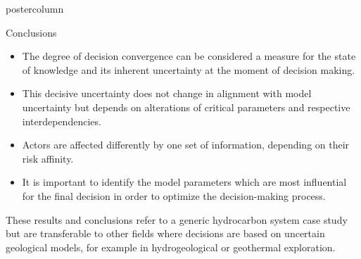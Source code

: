 \documentclass{beamer}
\begin{document}
\begin{frame}
\begin{columns}
\begin{column}{.618\textwidth}
\begin{beamercolorbox}[center]{postercolumn}
\begin{minipage}{.98\textwidth}
{				
\begin{myblock}{Conclusions}
\begin{itemize}
\item The degree of decision convergence can be considered a measure for the state of knowledge and its inherent uncertainty at the moment of decision making.
\item This decisive uncertainty does not change in alignment with model uncertainty but depends on alterations of critical parameters and respective interdependencies.
\item Actors are affected differently by one set of information, depending on their risk affinity.
\item It is important to identify the model parameters which are most influential for the final decision in order to
optimize the decision-making process.
\end{itemize}
These results and conclusions refer to a generic hydrocarbon system case study but are transferable to other fields where decisions
are based on uncertain geological models, for example in hydrogeological or geothermal exploration.

\end{myblock}}
\end{minipage}
\end{beamercolorbox}
\end{column}
\end{columns}
\end{frame}
\end{document}
